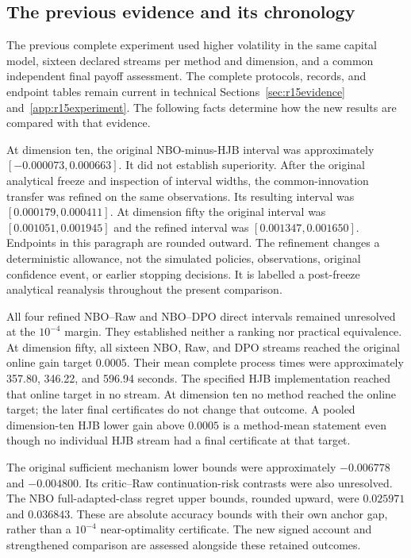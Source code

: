 \subsection{The previous evidence and its chronology}
\label{sec:r16historicalevidence}
The previous complete experiment used higher volatility in the same capital model, sixteen declared streams per method and dimension, and a common independent final payoff assessment. The complete protocols, records, and endpoint tables remain current in technical Sections~\ref{sec:r15evidence} and~\ref{app:r15experiment}. The following facts determine how the new results are compared with that evidence.

At dimension ten, the original NBO-minus-HJB interval was approximately $[-0.000073,0.000663]$. It did not establish superiority. After the original analytical freeze and inspection of interval widths, the common-innovation transfer was refined on the same observations. Its resulting interval was $[0.000179,0.000411]$. At dimension fifty the original interval was $[0.001051,0.001945]$ and the refined interval was $[0.001347,0.001650]$. Endpoints in this paragraph are rounded outward. The refinement changes a deterministic allowance, not the simulated policies, observations, original confidence event, or earlier stopping decisions. It is labelled a post-freeze analytical reanalysis throughout the present comparison.

All four refined NBO--Raw and NBO--DPO direct intervals remained unresolved at the $10^{-4}$ margin. They established neither a ranking nor practical equivalence. At dimension fifty, all sixteen NBO, Raw, and DPO streams reached the original online gain target $0.0005$. Their mean complete process times were approximately 357.80, 346.22, and 596.94 seconds. The specified HJB implementation reached that online target in no stream. At dimension ten no method reached the online target; the later final certificates do not change that outcome. A pooled dimension-ten HJB lower gain above $0.0005$ is a method-mean statement even though no individual HJB stream had a final certificate at that target.

The original sufficient mechanism lower bounds were approximately $-0.006778$ and $-0.004800$. Its critic--Raw continuation-risk contrasts were also unresolved. The NBO full-adapted-class regret upper bounds, rounded upward, were $0.025971$ and $0.036843$. These are absolute accuracy bounds with their own anchor gap, rather than a $10^{-4}$ near-optimality certificate. The new signed account and strengthened comparison are assessed alongside these retained outcomes.

